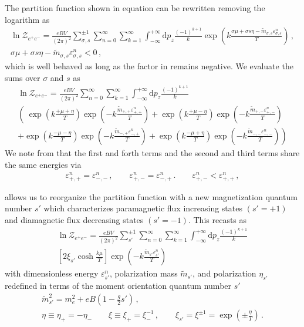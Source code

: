 The partition function shown in equation  can be rewritten removing the logarithm as
\begin{gather}
\label{partitionpower:1}
\ln{\mathcal{Z}_{e^{+}e^{-}}}=\frac{e{B}V}{(2\pi)^{2}}\sum_{\sigma,s}^{\pm1}\sum_{n=0}^{\infty}\sum_{k=1}^{\infty}\int_{-\infty}^{+\infty}\mathrm{d}p_{z}
\frac{(-1)^{k+1}}{k}\exp\left({k\frac{\sigma\mu+\sigma s\eta-{\tilde m}_{\sigma,s}\varepsilon^{n}_{\sigma,s}}{T}}\right)\,,\\
\label{bapprox} 
\sigma\mu+\sigma s\eta-{\tilde m}_{\sigma,s}\varepsilon_{\sigma,s}^{n}<0\,,
\end{gather}
which is well behaved as long as the factor in  remains negative. We evaluate the sums over $\sigma$ and $s$ as
\begin{multline}
    \label{partitionpower:2}
    \ln{\mathcal{Z}_{e^{+}e^{-}}}=\frac{e{B}V}{(2\pi)^{2}}\sum_{n=0}^{\infty}\sum_{k=1}^{\infty}\int_{-\infty}^{+\infty}\mathrm{d}p_{z}\frac{(-1)^{k+1}}{k}\\
    \left(\ \exp\left(k\frac{+\mu+\eta}{T}\right)\exp\left(-k\frac{{\tilde m}_{+,+}\varepsilon_{+,+}^{n}}{T}\right)\right.
    +\exp\left(k\frac{+\mu-\eta}{T}\right)\exp\left(-k\frac{{\tilde m}_{+,-}\varepsilon_{+,-}^{n}}{T}\right)\\
    +\exp\left(k\frac{-\mu-\eta}{T}\right)\exp\left(-k\frac{{\tilde m}_{-,+}\varepsilon_{-,+}^{n}}{T}\right)
    +\left.\exp\left(k\frac{-\mu+\eta}{T}\right)\exp\left(-k\frac{{\tilde m}_{-,-}\varepsilon_{-,-}^{n}}{T}\right)\right)
\end{multline}
We note from  that the first and forth terms and the second and third terms share the same energies via
\begin{align}
    \label{partitionpower:3}
    \varepsilon_{+,+}^{n}=\varepsilon_{-,-}^{n}\,,\qquad
    \varepsilon_{+,-}^{n}=\varepsilon_{-,+}^{n}\,.\qquad
    \varepsilon_{+,-}^{n}<\varepsilon_{+,+}^{n}\,,
\end{align}

 allows us to reorganize the partition function with a new magnetization quantum number $s'$ which characterizes paramagnetic flux increasing states $(s'=+1)$ and diamagnetic flux decreasing states $(s'=-1)$. This recasts  as
\begin{multline}
    \label{partitionpower:4}
    \ln{\mathcal{Z}_{e^{+}e^{-}}}=\frac{e{B}V}{(2\pi)^{2}}\sum_{s'}^{\pm1}\sum_{n=0}^{\infty}\sum_{k=1}^{\infty}\int_{-\infty}^{+\infty}\mathrm{d}p_{z}\frac{(-1)^{k+1}}{k}\\
    \left[2\xi_{s'}\cosh\frac{k\mu}{T}\right]\exp\left(-k\frac{{\tilde m}_{s'}\varepsilon_{s'}^{n}}{T}\right)
\end{multline}
with dimensionless energy $\varepsilon_{s'}^{n}$, polarization mass $\tilde{m}_{s'}$, and polarization $\eta_{s'}$ redefined in terms of the moment orientation quantum number $s'$
\begin{gather}
    {\tilde m}_{s'}^{2}=m_{e}^{2}+e{B}\left(1-\frac{g}{2}s'\right)\,,\\
    \eta\equiv\eta_{+}=-\eta_{-}\qquad\xi\equiv\xi_{+}=\xi_{-}^{-1}\,,\qquad\xi_{s'}=\xi^{\pm1}=\exp\left(\pm\frac{\eta}{T}\right)\,.
\end{gather}

